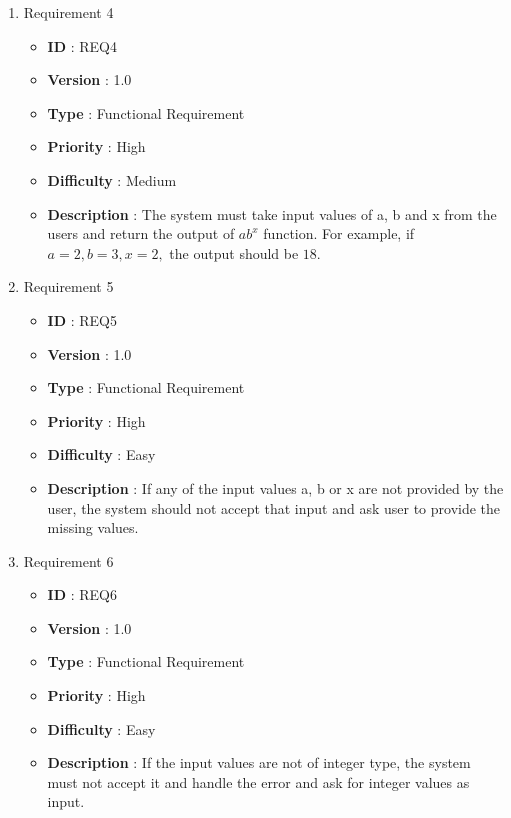 \documentclass[12pt, a4paper]{article}
\begin{document}
\begin{enumerate}
    \newpage
    
    \item{} Requirement 4
        \begin{itemize}
        \item \textbf{ID} : REQ4
        \item \textbf{Version} : 1.0
        \item \textbf{Type} : Functional Requirement
        \item \textbf{Priority} : High
        \item \textbf{Difficulty} : Medium
        \item \textbf{Description} : The system must take input values of a, b and x from the users and return the output of $ab^x$ function. For example, if $ a = 2, b = 3 , x = 2,$ the output should be $ 18 $.
        \end{itemize}
    
    \item{} Requirement 5
        \begin{itemize}
        \item \textbf{ID} : REQ5
        \item \textbf{Version} : 1.0
        \item \textbf{Type} : Functional Requirement
        \item \textbf{Priority} : High
        \item \textbf{Difficulty} : Easy
        \item \textbf{Description} : If any of the input values a, b or x are not provided by the user, the system should not accept that input and ask user to provide the missing values. 
        \end{itemize}
    
    \item{} Requirement 6
        \begin{itemize}
        \item \textbf{ID} : REQ6
        \item \textbf{Version} : 1.0
        \item \textbf{Type} : Functional Requirement
        \item \textbf{Priority} : High
        \item \textbf{Difficulty} : Easy
        \item \textbf{Description} : If the input values are not of integer type, the system must not accept it and handle the error and ask for integer values as input.
        \end{itemize}
        

\end{enumerate}
\end{document}
